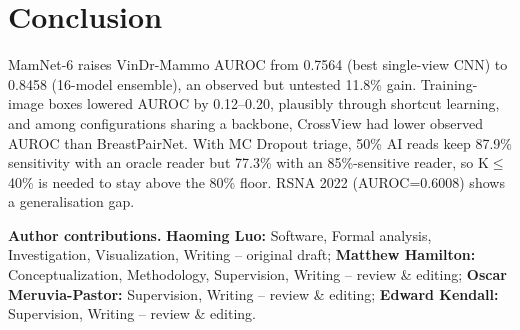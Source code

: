 \documentclass[conference]{IEEEtran}
\newcommand{\vindr}{VinDr-Mammo}
\newcommand{\rsna}{RSNA 2022}
\newcommand{\mamnet}{MamNet-6}
\begin{document}
\section{Conclusion}

\mamnet{} raises \vindr{} AUROC from 0.7564 (best single-view CNN) to 0.8458 (16-model ensemble), an observed but untested 11.8\% gain. Training-image boxes lowered AUROC by 0.12--0.20, plausibly through shortcut learning, and among configurations sharing a backbone, CrossView had lower observed AUROC than BreastPairNet. With MC Dropout triage, 50\% AI reads keep 87.9\% sensitivity with an oracle reader but 77.3\% with an 85\%-sensitive reader, so K$\leq$40\% is needed to stay above the 80\% floor. \rsna{} (AUROC=0.6008) shows a generalisation gap.

\noindent\textbf{Author contributions.} \textbf{Haoming Luo:} Software, Formal analysis, Investigation, Visualization, Writing -- original draft; \textbf{Matthew Hamilton:} Conceptualization, Methodology, Supervision, Writing -- review \& editing; \textbf{Oscar Meruvia-Pastor:} Supervision, Writing -- review \& editing; \textbf{Edward Kendall:} Supervision, Writing -- review \& editing.
\end{document}
